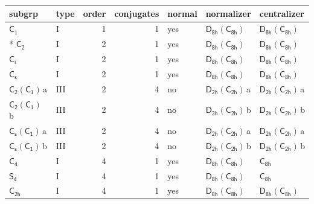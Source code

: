 \documentclass[10pt,a4paper]{article}
\numberwithin{equation}{section}
\newcommand{\grp}[1]{\mathsf{#1}}
\newcommand{\clsletter}[1]{\,{\scriptsize\color{black!55}#1}}
\begin{document}
{\small\begin{longtable}{@{}llrrlll@{}}\toprule
subgrp & type & order & conjugates & normal & normalizer & centralizer\\\midrule\endhead
\bottomrule\endfoot\endlastfoot
\href{../../../rotation/data/pdf/C1.pdf}{$\grp{C_{1}}$} & I & 1 & 1 & yes & \href{D8h-C8h.pdf}{$\grp{D_{8h}}(\grp{C_{8h}})$} & \href{D8h-C8h.pdf}{$\grp{D_{8h}}(\grp{C_{8h}})$}\\*
\href{../../../rotation/data/pdf/C2.pdf}{$\grp{C_{2}}$} & I & 2 & 1 & yes & \href{D8h-C8h.pdf}{$\grp{D_{8h}}(\grp{C_{8h}})$} & \href{D8h-C8h.pdf}{$\grp{D_{8h}}(\grp{C_{8h}})$}\\
\href{../../../rotation/data/pdf/S2.pdf}{$\grp{C_{i}}$} & I & 2 & 1 & yes & \href{D8h-C8h.pdf}{$\grp{D_{8h}}(\grp{C_{8h}})$} & \href{D8h-C8h.pdf}{$\grp{D_{8h}}(\grp{C_{8h}})$}\\
\href{../../../rotation/data/pdf/C1v.pdf}{$\grp{C_{s}}$} & I & 2 & 1 & yes & \href{D8h-C8h.pdf}{$\grp{D_{8h}}(\grp{C_{8h}})$} & \href{D8h-C8h.pdf}{$\grp{D_{8h}}(\grp{C_{8h}})$}\\
\href{C2-C1.pdf}{$\grp{C_{2}}(\grp{C_{1}})$}\clsletter{a} & III & 2 & 4 & no & \href{D2h-C2h.pdf}{$\grp{D_{2h}}(\grp{C_{2h}})$}\clsletter{a} & \href{D2h-C2h.pdf}{$\grp{D_{2h}}(\grp{C_{2h}})$}\clsletter{a}\\
\href{C2-C1.pdf}{$\grp{C_{2}}(\grp{C_{1}})$}\clsletter{b} & III & 2 & 4 & no & \href{D2h-C2h.pdf}{$\grp{D_{2h}}(\grp{C_{2h}})$}\clsletter{b} & \href{D2h-C2h.pdf}{$\grp{D_{2h}}(\grp{C_{2h}})$}\clsletter{b}\\
\href{C1v-C1.pdf}{$\grp{C_{s}}(\grp{C_{1}})$}\clsletter{a} & III & 2 & 4 & no & \href{D2h-C2h.pdf}{$\grp{D_{2h}}(\grp{C_{2h}})$}\clsletter{a} & \href{D2h-C2h.pdf}{$\grp{D_{2h}}(\grp{C_{2h}})$}\clsletter{a}\\
\href{C1v-C1.pdf}{$\grp{C_{s}}(\grp{C_{1}})$}\clsletter{b} & III & 2 & 4 & no & \href{D2h-C2h.pdf}{$\grp{D_{2h}}(\grp{C_{2h}})$}\clsletter{b} & \href{D2h-C2h.pdf}{$\grp{D_{2h}}(\grp{C_{2h}})$}\clsletter{b}\\
\href{../../../rotation/data/pdf/C4.pdf}{$\grp{C_{4}}$} & I & 4 & 1 & yes & \href{D8h-C8h.pdf}{$\grp{D_{8h}}(\grp{C_{8h}})$} & \href{../../../rotation/data/pdf/C8h.pdf}{$\grp{C_{8h}}$}\\
\href{../../../rotation/data/pdf/S4.pdf}{$\grp{S_{4}}$} & I & 4 & 1 & yes & \href{D8h-C8h.pdf}{$\grp{D_{8h}}(\grp{C_{8h}})$} & \href{../../../rotation/data/pdf/C8h.pdf}{$\grp{C_{8h}}$}\\
\href{../../../rotation/data/pdf/C2h.pdf}{$\grp{C_{2h}}$} & I & 4 & 1 & yes & \href{D8h-C8h.pdf}{$\grp{D_{8h}}(\grp{C_{8h}})$} & \href{D8h-C8h.pdf}{$\grp{D_{8h}}(\grp{C_{8h}})$}\\

\end{longtable}}
\end{document}
